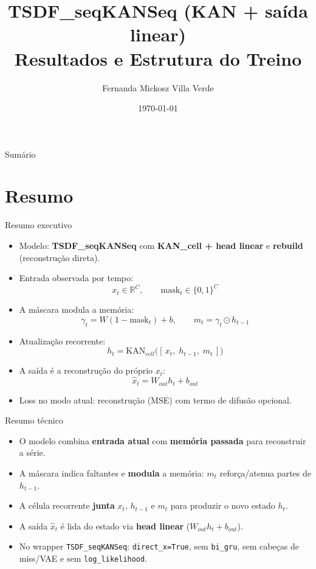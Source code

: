 \documentclass[10pt]{beamer}
\title[TSDF\_seqKANSeq - Resultados]{TSDF\_seqKANSeq (KAN + sa\'ida linear) \\ Resultados e Estrutura do Treino}
\author{Fernanda Mickosz Villa Verde}
\institute{CPE-883 - Aprendizado de Máquina}
\date{\today}
\begin{document}
\begin{frame}
  \titlepage
\end{frame}

\begin{frame}{Sumário}
\tableofcontents
\end{frame}

\section{Resumo}


\begin{frame}{Resumo executivo}
\begin{itemize}
\item Modelo: \textbf{TSDF\_seqKANSeq} com \textbf{KAN\_cell + head linear} e \textbf{rebuild} (reconstru\c{c}\~ao direta).
\item Entrada observada por tempo:
\[
x_t \in \mathbb{R}^{C}, \qquad \text{mask}_t \in \{0,1\}^{C}
\]
\item A m\'ascara modula a mem\'oria:
\[
\gamma_t = W(1-\text{mask}_t) + b,
\qquad m_t = \gamma_t \odot h_{t-1}
\]
\item Atualiza\c{c}\~ao recorrente:
\[
h_t = \mathrm{KAN}_{cell}\big([\,x_t,\; h_{t-1},\; m_t\,]\big)
\]
\item A sa\'ida \'e a reconstru\c{c}\~ao do pr\'oprio $x_t$:
\[
\hat{x}_t = W_{out} h_t + b_{out}
\]
\item Loss no modo atual: reconstru\c{c}\~ao (MSE) com termo de difus\~ao opcional.
\end{itemize}
\end{frame}

\begin{frame}{Resumo t\'ecnico}
\begin{itemize}
\item O modelo combina \textbf{entrada atual} com \textbf{mem\'oria passada} para reconstruir a s\'erie.
\item A m\'ascara indica faltantes e \textbf{modula} a mem\'oria:
$m_t$ refor\c{c}a/atenua partes de $h_{t-1}$.
\item A c\'elula recorrente \textbf{junta} $x_t$, $h_{t-1}$ e $m_t$ para produzir o novo estado $h_t$.
\item A sa\'ida $\hat{x}_t$ \'e lida do estado via \textbf{head linear} ($W_{out}h_t+b_{out}$).
\item No wrapper \texttt{TSDF\_seqKANSeq}: \texttt{direct\_x=True}, sem \texttt{bi\_gru}, sem cabe\c{c}as de miss/VAE e sem \texttt{log\_likelihood}.
\end{itemize}
\end{frame}
\end{document}
